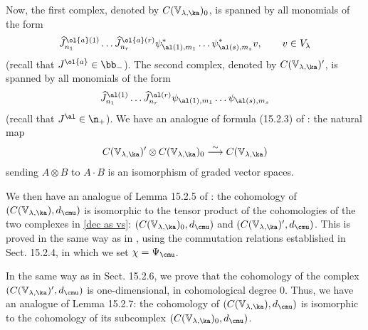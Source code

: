 \documentclass{amsart}
\newcommand{\wh}{\widehat}
\newcommand{\+}{\mathop{\oplus}}
\renewcommand{\*}{{\otimes}}
\newcommand{\mb}{\mathbb}
\newcommand{\lam}{\lambda}
\theoremstyle{theorem}
\theoremstyle{remark}
\numberwithin{equation}{section}
\begin{document}
Now, the first complex, denoted by $C({\mb V}_{\lam,\ka})_0$, is spanned
by all monomials of the form
\begin{equation}    \label{basis of C0}
\wh{J}^{\ol{a}(1)}_{n_1} \ldots \wh{J}^{\ol{a}(r)}_{n_r}
\psi^*_{\al(1),m_1} \ldots \psi^*_{\al(s),m_s} v, \qquad v \in V_\lam
\end{equation}
(recall that $J^{\ol{a}} \in \bb_-$). The second complex, denoted
by $C({\mb V}_{\lam,\ka})'$, is spanned by all monomials of the form
$$
\wh{J}^{\al(1)}_{n_1} \ldots \wh{J}^{\al(r)}_{n_r}
\psi_{\al(1),m_1} \ldots \psi_{\al(s),m_s}
$$
(recall that $J^{\al} \in \n_+$). We have an analogue of formula
(15.2.3) of \cite{FreBen04}: the natural map
\begin{equation}    \label{dec as vs}
C({\mb V}_{\lam,\ka})' \otimes C({\mb
  V}_{\lam,\ka})_0 \overset{\sim}\longrightarrow C({\mb V}_{\lam,\ka})
\end{equation}
sending $A \otimes B$ to $A \cdot B$ is an isomorphism of graded
vector spaces.

We then have an analogue of Lemma 15.2.5 of \cite{FreBen04}: the
cohomology of $(C({\mb V}_{\lam,\ka}),d_\cmu)$ is isomorphic to the
tensor product of the cohomologies of the two complexes in \eqref{dec
  as vs}: $(C({\mb V}_{\lam,\ka})_0,d_\cmu)$ and $(C({\mb
  V}_{\lam,\ka})',d_\cmu)$. This is proved in the same way as in
\cite{FreBen04}, using the commutation relations established in
Sect. 15.2.4, in which we set $\chi=\Psi_\cmu$.

In the same way as in Sect. 15.2.6, we prove that the cohomology of
the complex $(C({\mb V}_{\lam,\ka})',d_\cmu)$ is one-dimensional, in
cohomological degree 0. Thus, we have an analogue of Lemma 15.2.7: the
cohomology of $(C({\mb V}_{\lam,\ka}),d_\cmu)$ is isomorphic to the
cohomology of its subcomplex $(C({\mb V}_{\lam,\ka})_0,d_\cmu)$.
\end{document}
